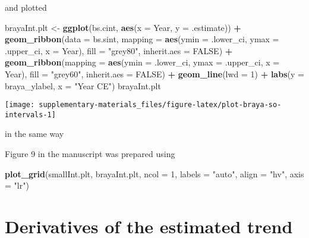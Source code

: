 \documentclass[12pt,]{article}
\newenvironment{Shaded}{\begin{snugshade}}{\end{snugshade}}
\newcommand{\DataTypeTok}[1]{\textcolor[rgb]{0.13,0.29,0.53}{#1}}
\newcommand{\DecValTok}[1]{\textcolor[rgb]{0.00,0.00,0.81}{#1}}
\newcommand{\KeywordTok}[1]{\textcolor[rgb]{0.13,0.29,0.53}{\textbf{#1}}}
\newcommand{\NormalTok}[1]{#1}
\newcommand{\OperatorTok}[1]{\textcolor[rgb]{0.81,0.36,0.00}{\textbf{#1}}}
\newcommand{\OtherTok}[1]{\textcolor[rgb]{0.56,0.35,0.01}{#1}}
\newcommand{\StringTok}[1]{\textcolor[rgb]{0.31,0.60,0.02}{#1}}
\begin{document}
and plotted

\begin{Shaded}
\begin{Highlighting}[]
\NormalTok{brayaInt.plt <-}\StringTok{ }\KeywordTok{ggplot}\NormalTok{(bs.cint, }\KeywordTok{aes}\NormalTok{(}\DataTypeTok{x =}\NormalTok{ Year, }\DataTypeTok{y =}\NormalTok{ .estimate)) }\OperatorTok{+}
\StringTok{    }\KeywordTok{geom_ribbon}\NormalTok{(}\DataTypeTok{data =}\NormalTok{ bs.sint,}
                \DataTypeTok{mapping =} \KeywordTok{aes}\NormalTok{(}\DataTypeTok{ymin =}\NormalTok{ .lower_ci, }\DataTypeTok{ymax =}\NormalTok{ .upper_ci, }\DataTypeTok{x =}\NormalTok{ Year),}
                \DataTypeTok{fill =} \StringTok{"grey80"}\NormalTok{, }\DataTypeTok{inherit.aes =} \OtherTok{FALSE}\NormalTok{) }\OperatorTok{+}
\StringTok{    }\KeywordTok{geom_ribbon}\NormalTok{(}\DataTypeTok{mapping =} \KeywordTok{aes}\NormalTok{(}\DataTypeTok{ymin =}\NormalTok{ .lower_ci, }\DataTypeTok{ymax =}\NormalTok{ .upper_ci, }\DataTypeTok{x =}\NormalTok{ Year),}
                \DataTypeTok{fill =} \StringTok{"grey60"}\NormalTok{, }\DataTypeTok{inherit.aes =} \OtherTok{FALSE}\NormalTok{) }\OperatorTok{+}
\StringTok{    }\KeywordTok{geom_line}\NormalTok{(}\DataTypeTok{lwd =} \DecValTok{1}\NormalTok{) }\OperatorTok{+}
\StringTok{    }\KeywordTok{labs}\NormalTok{(}\DataTypeTok{y =}\NormalTok{ braya_ylabel, }\DataTypeTok{x =} \StringTok{"Year CE"}\NormalTok{)}
\NormalTok{brayaInt.plt}
\end{Highlighting}
\end{Shaded}

\begin{center}\texttt{[image: supplementary-materials\_files/figure-latex/plot-braya-so-intervals-1]} \end{center}

in the same way

Figure 9 in the manuscript was prepared using

\begin{Shaded}
\begin{Highlighting}[]
\KeywordTok{plot_grid}\NormalTok{(smallInt.plt, brayaInt.plt, }\DataTypeTok{ncol =} \DecValTok{1}\NormalTok{, }\DataTypeTok{labels =} \StringTok{"auto"}\NormalTok{,}
          \DataTypeTok{align =} \StringTok{"hv"}\NormalTok{, }\DataTypeTok{axis =} \StringTok{"lr"}\NormalTok{)}
\end{Highlighting}
\end{Shaded}

\hypertarget{derivatives-of-the-estimated-trend}{%
\section{Derivatives of the estimated
trend}\label{derivatives-of-the-estimated-trend}}
\end{document}
